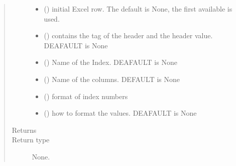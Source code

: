 \documentclass[letterpaper,10pt,english]{sphinxmanual}
\begin{document}
\begin{fulllineitems}
\begin{fulllineitems}
\begin{quote}
\begin{description}
\begin{itemize}
\item {} 
 (\sphinxstyleliteralemphasis{\sphinxupquote{, }}) \textendash{} initial Excel row. The default is None,
the first available is used.

\item {} 
 (\sphinxstyleliteralemphasis{\sphinxupquote{ (}}\sphinxstyleliteralemphasis{\sphinxupquote{, }}\sphinxstyleliteralemphasis{\sphinxupquote{)}}) \textendash{} contains the tag of the header and the header value. DEAFAULT is
None

\item {} 
 () \textendash{} Name of the Index. DEAFAULT is None

\item {} 
 () \textendash{} Name of the columns. DEFAULT is None

\item {} 
 () \textendash{} format of index numbers

\item {} 
 () \textendash{} how to format the values. DEAFAULT is None

\end{itemize}

\item[{Returns}] \leavevmode


\item[{Return type}] \leavevmode
None.

\end{description}\end{quote}

\end{fulllineitems}



\end{fulllineitems}
\end{document}
